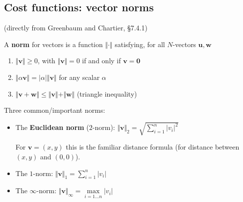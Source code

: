 \documentclass[12pt,letterpaper,noanswers]{exam}
\newcommand{\vc}[1]{\boldsymbol{#1}}
\begin{document}
\subsection{Cost functions: vector norms}

\begin{tcolorbox}
(directly from Greenbaum and Chartier, \S7.4.1) 

A \textbf{norm} for vectors is a function $\Vert \cdot \Vert$ satisfying, for all $N$-vectors $\vc{u},\vc{w}$
\begin{enumerate}
\itemsep0pt
    \item $\Vert \vc{v}\Vert \geq 0$, with $\Vert \vc{v}\Vert = 0$ if and only if $\vc{v} = \vc{0}$
    \item $\Vert \alpha \vc{v} \Vert= \vert \alpha\vert\Vert\vc{v}\Vert$ for any scalar $\alpha$
    \item $\Vert \vc{v}+\vc{w}\Vert\leq \Vert\vc{v}\Vert+\Vert\vc{w}\Vert$ (triangle inequality)
\end{enumerate}
\end{tcolorbox}

\begin{tcolorbox}
Three common/important norms:
\begin{itemize}
\itemsep0pt
    \item The \textbf{Euclidean norm} ($2$-norm): $\displaystyle\Vert\vc{v}\Vert_2 = \sqrt{\sum\limits_{i=1}^n \vert v_i\vert^2}$
    
    For $\vc{v} = (x,y)$ this is the familiar distance formula (for distance between $(x,y)$ and $(0,0)$).
    
    \item The $1$-norm: $\displaystyle\Vert\vc{v}\Vert_1 = \sum\limits_{i=1}^n \vert v_i\vert$
    
    \item The $\infty$-norm: $\displaystyle\Vert\vc{v}\Vert_{\infty} = \max\limits_{i=1...n} \vert v_i\vert$
\end{itemize}
\end{tcolorbox}
\end{document}
